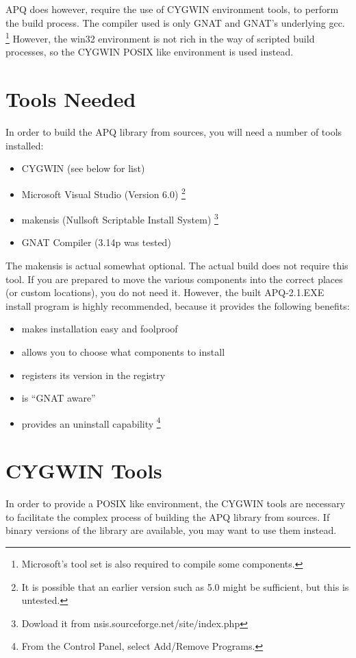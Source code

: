 \documentclass[english]{report}
\begin{document}
APQ does however, require the use of CYGWIN environment tools, to
perform the build process. The compiler used is only GNAT and GNAT's
underlying gcc.%
\footnote{Microsoft's tool set is also required to compile some components.%
} However, the win32 environment is not rich in the way of scripted
build processes, so the CYGWIN POSIX like environment is used instead.


\section{Tools Needed}

In order to build the APQ library from sources, you will need a number
of tools installed:

\begin{itemize}
\item CYGWIN (see below for list)
\item Microsoft Visual Studio (Version 6.0)%
\footnote{It is possible that an earlier version such as 5.0 might be sufficient,
but this is untested.%
}
\item makensis (Nullsoft Scriptable Install System)%
\footnote{Dowload it from nsis.sourceforge.net/site/index.php%
}
\item GNAT Compiler (3.14p was tested)
\end{itemize}
The makensis is actual somewhat optional. The actual build does not
require this tool. If you are prepared to move the various components
into the correct places (or custom locations), you do not need it.
However, the built APQ-2.1.EXE install program is highly recommended,
because it provides the following benefits:

\begin{itemize}
\item makes installation easy and foolproof
\item allows you to choose what components to install
\item registers its version in the registry
\item is {}``GNAT aware''
\item provides an uninstall capability%
\footnote{From the Control Panel, select Add/Remove Programs.%
}
\end{itemize}

\section{CYGWIN Tools}

In order to provide a POSIX like environment, the CYGWIN tools are
necessary to facilitate the complex process of building the APQ library
from sources. If binary versions of the library are available, you
may want to use them instead.
\end{document}
